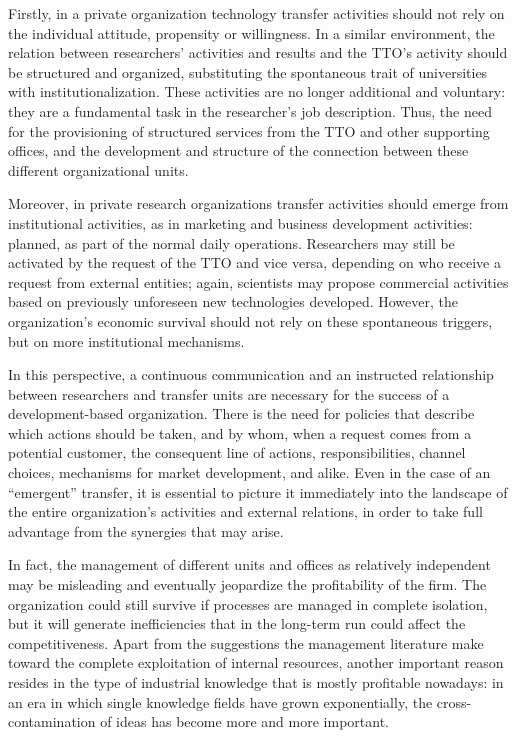 Firstly, in a private organization technology transfer activities should not rely on the individual attitude, propensity or willingness. In a similar environment, the relation between researchers' activities and results and the TTO's activity should be structured and organized, substituting the spontaneous trait of universities with institutionalization. These activities are no longer additional and voluntary: they are a fundamental task in the researcher's job description. Thus, the need for the provisioning of structured services from the TTO and other supporting offices, and the development and structure of the connection between these different organizational units. 

Moreover, in private research organizations transfer activities should emerge from institutional activities, as in marketing and business development activities: planned, as part of the normal daily operations. Researchers may still be activated by the request of the TTO and vice versa, depending on who receive a request from external entities; again, scientists may propose commercial activities based on previously unforeseen new technologies developed. However, the organization's economic survival should not rely on these spontaneous triggers, but on more institutional mechanisms.

In this perspective, a continuous communication and an instructed relationship between researchers and transfer units are necessary for the success of a development-based organization. There is the need for policies that describe which actions should be taken, and by whom, when a request comes from a potential customer, the consequent line of actions, responsibilities, channel choices, mechanisms for market development, and alike. Even in the case of an \enquote{emergent} transfer, it is essential to picture it immediately into the landscape of the entire organization's activities and external relations, in order to take full advantage from the synergies that may arise. 

In fact, the management of different units and offices as relatively independent may be misleading and eventually jeopardize the profitability of the firm. The organization could still survive if processes are managed in complete isolation, but it will generate inefficiencies that in the long-term run could affect the competitiveness. Apart from the suggestions the management literature make toward the complete exploitation of internal resources, another important reason resides in the type of industrial knowledge that is mostly profitable nowadays: in an era in which single knowledge fields have grown exponentially, the cross-contamination of ideas has become more and more important. 


